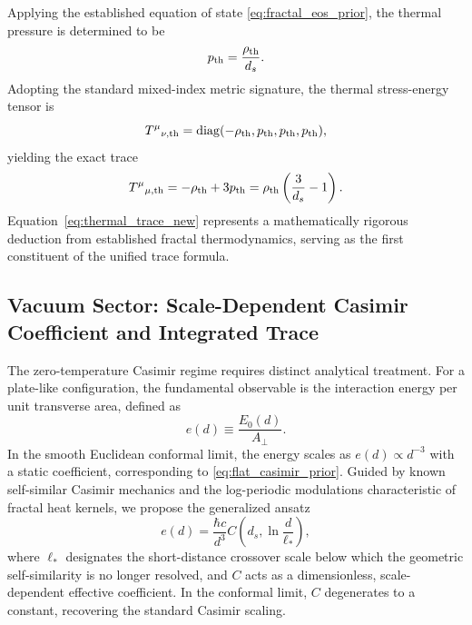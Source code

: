 \documentclass[12pt,letterpaper]{article}
\begin{document}
Applying the established equation of state \eqref{eq:fractal_eos_prior}, the thermal pressure is determined to be
\begin{equation}
p_{\rm th}=\frac{\rho_{\rm th}}{d_s}.
\label{eq:thermal_pressure_new}
\end{equation}
Adopting the standard mixed-index metric signature, the thermal stress-energy tensor is
\begin{equation}
T^\mu{}_{\nu,\rm th}=\mathrm{diag}(-\rho_{\rm th},p_{\rm th},p_{\rm th},p_{\rm th}),
\end{equation}
yielding the exact trace
\begin{equation}
T^\mu{}_{\mu,\rm th} = -\rho_{\rm th}+3p_{\rm th} = \rho_{\rm th}\left(\frac{3}{d_s}-1\right).
\label{eq:thermal_trace_new}
\end{equation}
Equation~\eqref{eq:thermal_trace_new} represents a mathematically rigorous deduction from established fractal thermodynamics, serving as the first constituent of the unified trace formula.

\subsection{Vacuum Sector: Scale-Dependent Casimir Coefficient and Integrated Trace}

The zero-temperature Casimir regime requires distinct analytical treatment.
For a plate-like configuration, the fundamental observable is the interaction energy per unit transverse area, defined as
\begin{equation}
e(d) \equiv \frac{E_0(d)}{A_\perp}.
\end{equation}
In the smooth Euclidean conformal limit, the energy scales as $e(d)\propto d^{-3}$ with a static coefficient, corresponding to \eqref{eq:flat_casimir_prior}.
Guided by known self-similar Casimir mechanics and the log-periodic modulations characteristic of fractal heat kernels, we propose the generalized ansatz
\begin{equation}
e(d)=\frac{\hbar c}{d^3} C\!\left(d_s,\ln\frac{d}{\ell_*}\right),
\label{eq:edef}
\end{equation}
where $\ell_*$ designates the short-distance crossover scale below which the geometric self-similarity is no longer resolved, and $C$ acts as a dimensionless, scale-dependent effective coefficient.
In the conformal limit, $C$ degenerates to a constant, recovering the standard Casimir scaling.
\end{document}
